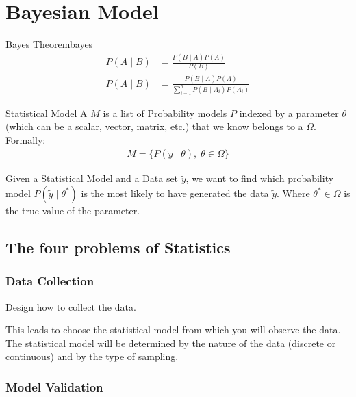 
\section{Bayesian Model}

\begin{theorem}{Bayes Theorem}{bayes}
	\begin{align}
		P(A \mid B) & = \frac{P(B \mid A)P(A)}{P(B)}                             \\
		P(A \mid B) & = \frac{P(B \mid A)P(A)}{\sum_{i=1}^n P(B \mid A_i)P(A_i)}
	\end{align}
\end{theorem}

\begin{definition}{Statistical Model}{}
	A  $M$ is a list of Probability models $P$ indexed by
	a parameter $\theta$ (which can be a scalar, vector, matrix, etc.) that
	we know belongs to a  $\Omega$.
	\\[1em]
	Formally:
	\begin{align}
		M = \{ P(\tilde{y}\mid\theta), \; \theta \in \Omega \}
	\end{align}
\end{definition}

Given a Statistical Model and a Data set $\tilde{y}$, we want to find
which probability model $P(\tilde{y}\mid\theta^*)$ is the most likely to
have generated the data $\tilde{y}$. Where $\theta^* \in \Omega$ is the true
value of the parameter.

\subsection{The four problems of Statistics}
\subsubsection{Data Collection}
Design how to collect the data.

This leads to choose the statistical model from which you will observe the data.
The statistical model will be determined by the nature of the data
(discrete or continuous) and by the type of sampling.

\subsubsection{Model Validation}

